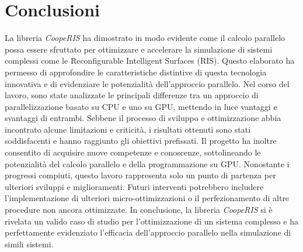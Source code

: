 \chapter{Conclusioni}
\label{cha:conclusioni}

La libreria \textit{CoopeRIS} ha dimostrato in modo evidente come il calcolo parallelo
possa essere sfruttato per ottimizzare e accelerare la simulazione di sistemi complessi
come le Reconfigurable Intelligent Surfaces (RIS). Questo elaborato ha permesso
di approfondire le caratteristiche distintive di questa tecnologia innovativa e
di evidenziare le potenzialità dell'approccio parallelo. Nel corso del lavoro,
sono state analizzate le principali differenze tra un approccio di
parallelizzazione basato su CPU e uno su GPU, mettendo in luce vantaggi e svantaggi
di entrambi. Sebbene il processo di sviluppo e ottimizzazione abbia incontrato
alcune limitazioni e criticità, i risultati ottenuti sono stati soddisfacenti e hanno
raggiunto gli obiettivi prefissati. Il progetto ha inoltre consentito di
acquisire nuove competenze e conoscenze, sottolineando le potenzialità del calcolo
parallelo e della programmazione su GPU. Nonostante i progressi compiuti, questo
lavoro rappresenta solo un punto di partenza per ulteriori sviluppi e miglioramenti.
Futuri interventi potrebbero includere l'implementazione di ulteriori micro-ottimizzazioni
o il perfezionamento di altre procedure non ancora ottimizzate. In conclusione,
la libreria \textit{CoopeRIS} si è rivelata un valido caso di studio per l'ottimizzazione
di un sistema complesso e ha perfettamente evidenziato l'efficacia dell'approccio
parallelo nella simulazione di simili sistemi.